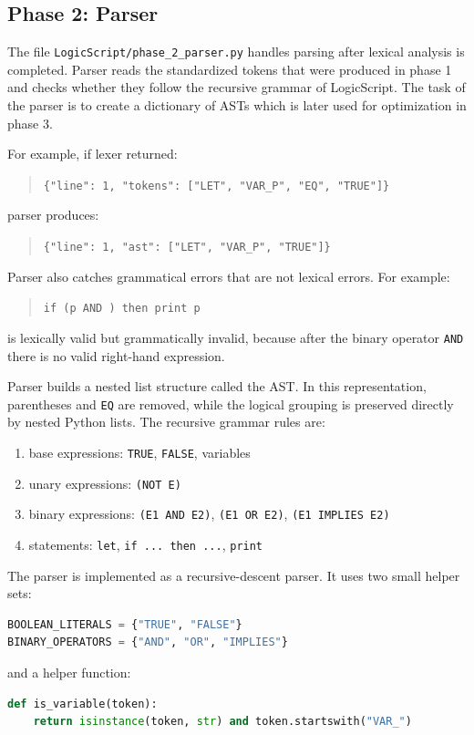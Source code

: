 \documentclass[11pt]{article}
\begin{document}
\subsection{Phase 2: Parser}
The file \texttt{LogicScript/phase\_2\_parser.py} handles parsing after lexical analysis is completed. Parser reads the standardized tokens that were produced in phase 1 and checks whether they follow the recursive grammar of LogicScript. The task of the parser is to create a dictionary of ASTs which is later used for optimization in phase 3.

For example, if lexer returned:
\begin{quote}
\texttt{\{"line": 1, "tokens": ["LET", "VAR\_P", "EQ", "TRUE"]\}}
\end{quote}
parser produces:
\begin{quote}
\texttt{\{"line": 1, "ast": ["LET", "VAR\_P", "TRUE"]\}}
\end{quote}

Parser also catches grammatical errors that are not lexical errors. For example:
\begin{quote}
\texttt{if (p AND ) then print p}
\end{quote}
is lexically valid but grammatically invalid, because after the binary operator \texttt{AND} there is no valid right-hand expression.

Parser builds a nested list structure called the AST. In this representation, parentheses and \texttt{EQ} are removed, while the logical grouping is preserved directly by nested Python lists. The recursive grammar rules are:
\begin{enumerate}
    \item base expressions: \texttt{TRUE}, \texttt{FALSE}, variables
    \item unary expressions: \texttt{(NOT E)}
    \item binary expressions: \texttt{(E1 AND E2)}, \texttt{(E1 OR E2)}, \texttt{(E1 IMPLIES E2)}
    \item statements: \texttt{let}, \texttt{if ... then ...}, \texttt{print}
\end{enumerate}

The parser is implemented as a recursive-descent parser. It uses two small helper sets:
\begin{lstlisting}[language=Python]
BOOLEAN_LITERALS = {"TRUE", "FALSE"}
BINARY_OPERATORS = {"AND", "OR", "IMPLIES"}
\end{lstlisting}
and a helper function:
\begin{lstlisting}[language=Python]
def is_variable(token):
    return isinstance(token, str) and token.startswith("VAR_")
\end{lstlisting}
\end{document}
